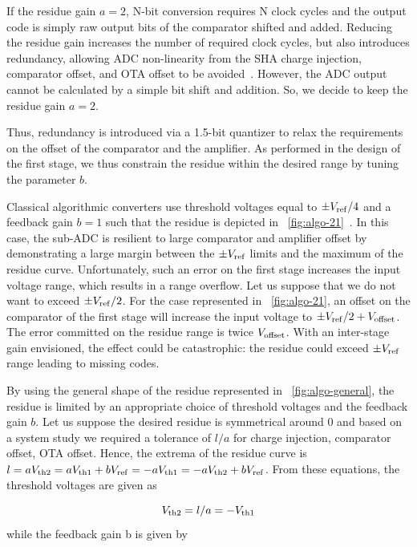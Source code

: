 If the residue gain \(a = 2\), N-bit conversion requires N clock cycles and the output code is simply raw output bits of the comparator shifted and added. Reducing the residue gain increases the number of required clock cycles, but also introduces redundancy, allowing ADC non-linearity from the SHA charge injection, comparator offset, and OTA offset to be avoided~\cite{Lewis1987}. However, the ADC output cannot be calculated by a simple bit shift and addition. So, we decide to keep the residue gain \(a = 2\).

Thus, redundancy is introduced via a 1.5-bit quantizer to relax the requirements on the offset of the comparator and the amplifier. As performed in the design of the first stage, we thus constrain the residue within the desired range by tuning the parameter $b$.

Classical algorithmic converters use threshold voltages equal to \(\pm V_{\rm ref}/4\) and a feedback gain \(b = 1\) such that the residue is depicted in \figurename~\ref{fig:algo-21}~\cite{Brooks2009,Naderi2017}. In this case, the sub-ADC is resilient to large comparator and amplifier offset by demonstrating a large margin between the \(\pm V_{\rm ref}\) limits and the maximum of the residue curve. Unfortunately, such an error on the first stage increases the input voltage range, which results in a range overflow. Let us suppose that we do not want to exceed $\pm V_{\rm ref}/2$. For the case represented in \figurename~\ref{fig:algo-21}, an offset on the comparator of the first stage will increase the input voltage to $\pm V_{\rm ref}/2+V_{\rm offset}$. The error committed on the residue range is twice $V_{\rm offset}$. With an inter-stage gain envisioned, the effect could be catastrophic: the residue could exceed $\pm V_{\rm ref}$ range leading to missing codes.

By using the general shape of the residue represented in \figurename~\ref{fig:algo-general}, the residue is limited by an appropriate choice of threshold voltages and the feedback gain \(b\). Let us suppose the desired residue is symmetrical around 0 and based on a system study we required a tolerance of \(l/a\) for charge injection, comparator offset, OTA offset. Hence, the extrema of the residue curve is \(l = aV_{\rm th2} = aV_{\rm th1}+bV_{\rm ref} = -aV_{\rm th1} = -aV_{\rm th2}+bV_{\rm ref}\). From these equations, the threshold voltages are given as 

\begin{equation}
V_{\rm th2} = l/a = -V_{\rm th1}
\end{equation}
while the feedback gain b is given by 

